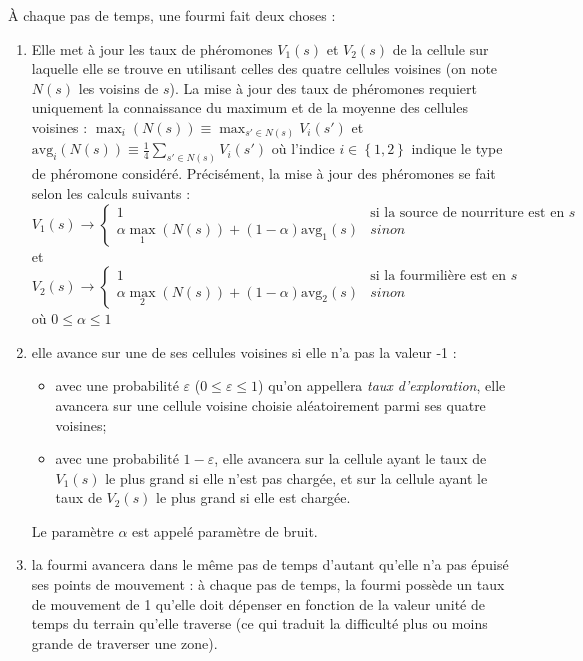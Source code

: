\documentclass[a4]{article}
\newcommand{\avg}{\textrm{avg}}
\begin{document}
À chaque pas de temps, une fourmi fait deux choses :
\begin{enumerate}
\item Elle met à jour les taux de phéromones $V_{1}(s)$ et $V_{2}(s)$ de la cellule sur laquelle elle se trouve en utilisant celles des quatre cellules voisines (on note $N(s)$ les voisins de $s$).
  La mise à jour des taux de phéromones requiert uniquement la connaissance du maximum et de la moyenne des cellules voisines :
  $\max_{i}\left(N(s)\right) \equiv \max_{s'\in N(s)}V_{i}(s')$
  et $\avg_{i}\left(N(s)\right)\equiv\frac{1}{4} \sum_{s'\in N(s)} V_{i}(s')$
  où l'indice $i\in\left\{1,2\right\}$ indique le type de phéromone considéré.
  Précisément, la mise à jour des phéromones se fait selon les calculs suivants :
\[
V_{1}(s) \rightarrow \left\{\begin{array}{ll} 
 1 & \mbox{si la source de nourriture est en }s \\
 \alpha \max_{1}(N(s)) + (1-\alpha)\avg_{1}(s) & sinon
 \end{array}\right.
 \]
 et
\[
V_{2}(s) \rightarrow \left\{\begin{array}{ll} 
 1 & \mbox{si la fourmilière est en }s \\
 \alpha \max_{2}(N(s)) + (1-\alpha)\avg_{2}(s) & sinon
 \end{array}\right.
 \]
où $0\leq \alpha \leq 1$ 
\item elle avance sur une de ses cellules voisines si elle n'a pas la valeur -1 :
\begin{itemize}
\item avec une probabilité $\varepsilon$ ($0 \leq \varepsilon \leq 1$) qu'on appellera \textsl{taux d'exploration}, elle avancera sur une cellule voisine choisie aléatoirement parmi ses quatre voisines;
\item avec une probabilité $1-\varepsilon$, elle avancera sur la cellule ayant le taux de $V_{1}(s)$ le plus grand si elle n'est pas
chargée, et sur la cellule ayant le taux de $V_{2}(s)$ le plus grand si elle est chargée.
\end{itemize}
Le paramètre $\alpha$ est appelé paramètre de bruit.
\item la fourmi avancera dans le même pas de temps d'autant qu'elle n'a pas épuisé ses points de mouvement : à chaque pas de temps, la
fourmi possède un taux de mouvement de 1 qu'elle doit dépenser en fonction de la valeur unité de temps du terrain qu'elle traverse (ce
qui traduit la difficulté plus ou moins grande de traverser une zone). 
\end{enumerate}
\end{document}
